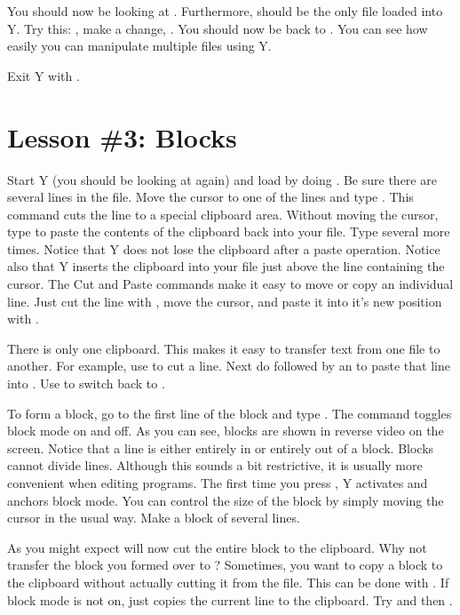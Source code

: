 You should now be looking at . Furthermore,  should be
the only file loaded into Y. Try this: , make a change, . You
should now be back to . You can see how easily you can manipulate multiple
files using Y.

Exit Y with .

\section{Lesson \#3: Blocks}

Start Y (you should be looking at  again) and load  by
doing . Be sure there are several lines in the file. Move the cursor to one
of the lines and type . This command cuts the line to a special clipboard area.
Without moving the cursor, type  to paste the contents of the clipboard back into your
file. Type  several more times. Notice that Y does not lose the clipboard after a
paste operation. Notice also that Y inserts the clipboard into your file just above the line
containing the cursor. The Cut and Paste commands make it easy to move or copy an individual
line. Just cut the line with , move the cursor, and paste it into it's new position
with .

There is only one clipboard. This makes it easy to transfer text from one file to another. For
example, use  to cut a line. Next do  followed by an  to paste
that line into . Use  to switch back to .

To form a block, go to the first line of the block and type . The  command
toggles block mode on and off. As you can see, blocks are shown in reverse video on the screen.
Notice that a line is either entirely in or entirely out of a block. Blocks cannot divide lines.
Although this sounds a bit restrictive, it is usually more convenient when editing programs. The
first time you press , Y activates and anchors block mode. You can control the size of
the block by simply moving the cursor in the usual way. Make a block of several lines.

As you might expect  will now cut the entire block to the clipboard. Why not transfer
the block you formed over to ? Sometimes, you want to copy a block to the
clipboard without actually cutting it from the file. This can be done with . If
block mode is not on,  just copies the current line to the clipboard. Try
 and then .

